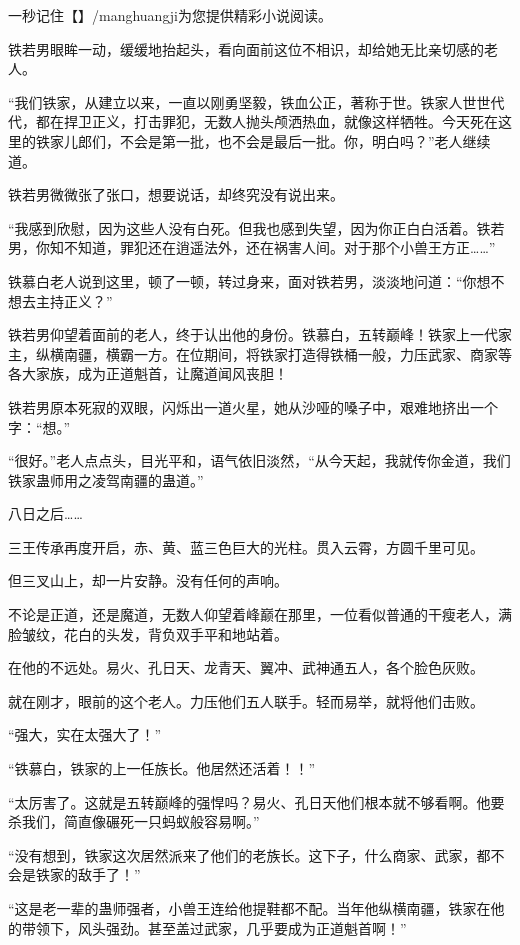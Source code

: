 
\begin{this_body}

一秒记住【】/manghuangji为您提供精彩小说阅读。

铁若男眼眸一动，缓缓地抬起头，看向面前这位不相识，却给她无比亲切感的老人。

“我们铁家，从建立以来，一直以刚勇坚毅，铁血公正，著称于世。铁家人世世代代，都在捍卫正义，打击罪犯，无数人抛头颅洒热血，就像这样牺牲。今天死在这里的铁家儿郎们，不会是第一批，也不会是最后一批。你，明白吗？”老人继续道。

铁若男微微张了张口，想要说话，却终究没有说出来。

“我感到欣慰，因为这些人没有白死。但我也感到失望，因为你正白白活着。铁若男，你知不知道，罪犯还在逍遥法外，还在祸害人间。对于那个小兽王方正……”

铁慕白老人说到这里，顿了一顿，转过身来，面对铁若男，淡淡地问道：“你想不想去主持正义？”

铁若男仰望着面前的老人，终于认出他的身份。铁慕白，五转巅峰！铁家上一代家主，纵横南疆，横霸一方。在位期间，将铁家打造得铁桶一般，力压武家、商家等各大家族，成为正道魁首，让魔道闻风丧胆！

铁若男原本死寂的双眼，闪烁出一道火星，她从沙哑的嗓子中，艰难地挤出一个字：“想。”

“很好。”老人点点头，目光平和，语气依旧淡然，“从今天起，我就传你金道，我们铁家蛊师用之凌驾南疆的蛊道。”

八日之后……

三王传承再度开启，赤、黄、蓝三色巨大的光柱。贯入云霄，方圆千里可见。

但三叉山上，却一片安静。没有任何的声响。

不论是正道，还是魔道，无数人仰望着峰巅在那里，一位看似普通的干瘦老人，满脸皱纹，花白的头发，背负双手平和地站着。

在他的不远处。易火、孔日天、龙青天、翼冲、武神通五人，各个脸色灰败。

就在刚才，眼前的这个老人。力压他们五人联手。轻而易举，就将他们击败。

“强大，实在太强大了！”

“铁慕白，铁家的上一任族长。他居然还活着！！”

“太厉害了。这就是五转巅峰的强悍吗？易火、孔日天他们根本就不够看啊。他要杀我们，简直像碾死一只蚂蚁般容易啊。”

“没有想到，铁家这次居然派来了他们的老族长。这下子，什么商家、武家，都不会是铁家的敌手了！”

“这是老一辈的蛊师强者，小兽王连给他提鞋都不配。当年他纵横南疆，铁家在他的带领下，风头强劲。甚至盖过武家，几乎要成为正道魁首啊！”


\end{this_body}

